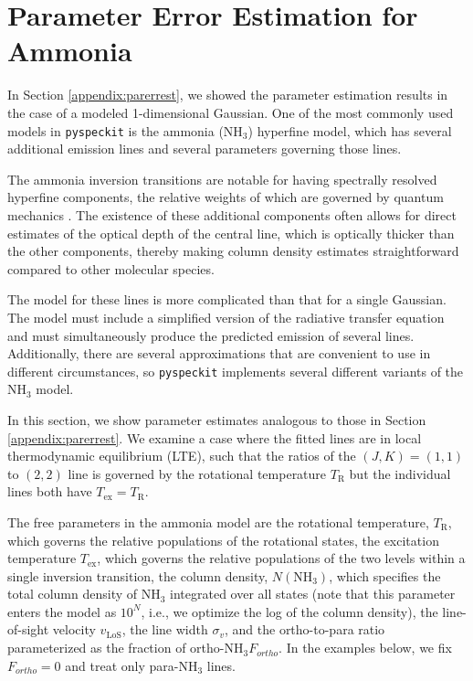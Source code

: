 \documentclass[twocolumn]{aastex62}
\newcommand{\pyspeckit}{\texttt{pyspeckit}\xspace}
\newcommand{\ammonia}{\ensuremath{\mathrm{NH}_3}\xspace}
\begin{document}
\section{Parameter Error Estimation for Ammonia}
\label{appendix:parerrestammonia}
In Section \ref{appendix:parerrest}, we showed the parameter estimation results
in the case of a modeled 1-dimensional Gaussian.  One of the most commonly used
models in \pyspeckit is the ammonia (\ammonia) hyperfine model, which has several
additional emission lines and several parameters governing those lines.

The ammonia inversion transitions are notable for having spectrally resolved
hyperfine components, the relative weights of which are governed by quantum
mechanics \citep{mangum15}. The existence of these additional components often
allows for direct estimates of the optical depth of the central line, which is
optically thicker than the other components, thereby making column density
estimates straightforward compared to other molecular species.

The model for these lines is more complicated than that for a single Gaussian.
The model must include a simplified version of the radiative transfer equation
and must simultaneously produce the predicted emission of several lines.
Additionally, there are several approximations that are convenient to use
in different circumstances, so \pyspeckit implements several different
variants of the \ammonia model.

In this section, we show parameter estimates analogous to those in Section
\ref{appendix:parerrest}.
We examine a case where the fitted lines are in local
thermodynamic equilibrium (LTE), such that the ratios of the $(J,K)=(1,1)$
to $(2,2)$ line is governed by the rotational temperature $T_\mathrm{R}$ but
the individual lines both have $T_{\mathrm{ex}}=T_{\mathrm{R}}$.

The free parameters in the ammonia model are the rotational temperature,
$T_{\mathrm{R}}$, which governs the relative populations of the rotational
states, the excitation temperature $T_{\mathrm{ex}}$, which governs the
relative populations of the two levels within a single inversion transition,
the column density, $N(\ammonia)$, which specifies the total column density of
\ammonia integrated over all states (note that this parameter enters the model
as $10^N$, i.e., we optimize the log of the column density), the line-of-sight
velocity $v_\mathrm{LoS}$, the line width $\sigma_v$, and the ortho-to-para
ratio parameterized as the fraction of ortho-\ammonia $F_{ortho}$.  In the
examples below, we fix $F_{ortho}=0$ and treat only para-\ammonia lines.
\end{document}

